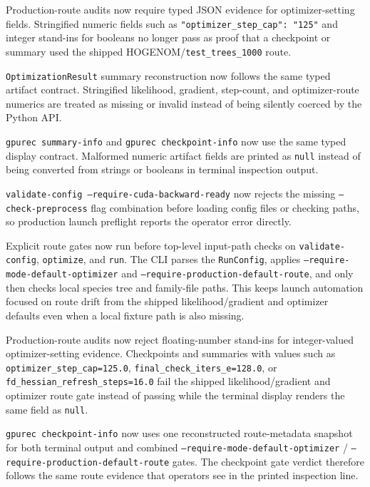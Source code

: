 \documentclass[11pt]{article}
\begin{document}
Production-route audits now require typed JSON evidence for optimizer-setting
fields.  Stringified numeric fields such as
\texttt{"optimizer\_step\_cap": "125"} and integer stand-ins for booleans no
longer pass as proof that a checkpoint or summary used the shipped
HOGENOM/\texttt{test\_trees\_1000} route.

\texttt{OptimizationResult} summary reconstruction now follows the same typed
artifact contract.  Stringified likelihood, gradient, step-count, and
optimizer-route numerics are treated as missing or invalid instead of being
silently coerced by the Python API.

\texttt{gpurec summary-info} and \texttt{gpurec checkpoint-info} now use the
same typed display contract.  Malformed numeric artifact fields are printed as
\texttt{null} instead of being converted from strings or booleans in terminal
inspection output.

\texttt{validate-config --require-cuda-backward-ready} now rejects the missing
\texttt{--check-preprocess} flag combination before loading config files or
checking paths, so production launch preflight reports the operator error
directly.

Explicit route gates now run before top-level input-path checks on
\texttt{validate-config}, \texttt{optimize}, and \texttt{run}.  The CLI parses
the \texttt{RunConfig}, applies
\texttt{--require-mode-default-optimizer} and
\texttt{--require-production-default-route}, and only then checks local species
tree and family-file paths.  This keeps launch automation focused on route
drift from the shipped likelihood/gradient and optimizer defaults even when a
local fixture path is also missing.

Production-route audits now reject floating-number stand-ins for integer-valued
optimizer-setting evidence.  Checkpoints and summaries with values such as
\texttt{optimizer\_step\_cap=125.0},
\texttt{final\_check\_iters\_e=128.0}, or
\texttt{fd\_hessian\_refresh\_steps=16.0} fail the shipped
likelihood/gradient and optimizer route gate instead of passing while the
terminal display renders the same field as \texttt{null}.

\texttt{gpurec checkpoint-info} now uses one reconstructed route-metadata
snapshot for both terminal output and combined
\texttt{--require-mode-default-optimizer} /
\texttt{--require-production-default-route} gates.  The checkpoint gate verdict
therefore follows the same route evidence that operators see in the printed
inspection line.
\end{document}
